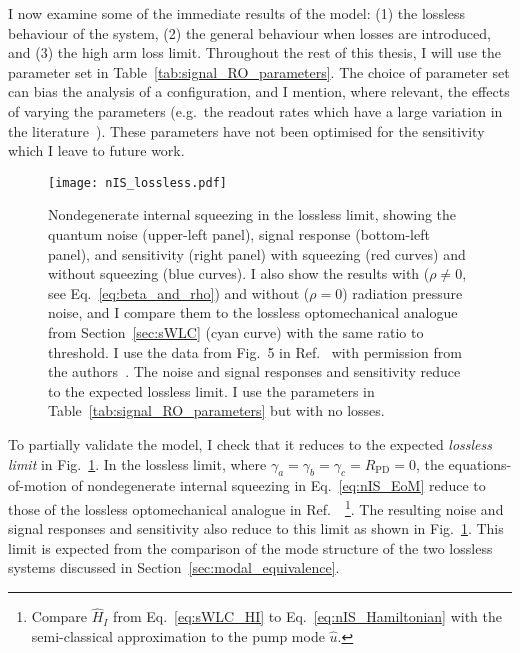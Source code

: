 I now examine some of the immediate results of the model: (1) the lossless behaviour of the system, (2) the general behaviour when losses are introduced, and (3) the high arm loss limit.
Throughout the rest of this thesis, I will use the parameter set in Table~\ref{tab:signal_RO_parameters}. The choice of parameter set can bias the analysis of a configuration, and I mention, where relevant, the effects of varying the parameters (e.g.\ the readout rates which have a large variation in the literature~\cite{liBroadbandSensitivityImprovement2020,miaoDesignGravitationalWaveDetectors2018,korobkoQuantumExpanderGravitationalwave2019}). These parameters have not been optimised for the sensitivity which I leave to future work. %

\label{sec:nIS_lossless_limit}

\begin{figure}
    \centering
    \texttt{[image: nIS\_lossless.pdf]}
    \caption{Nondegenerate internal squeezing in the lossless limit, showing the quantum noise (upper-left panel), signal response (bottom-left panel), and sensitivity (right panel) with squeezing (red curves) and without squeezing (blue curves). I also show the results with ($\rho\neq0$, see Eq.~\ref{eq:beta_and_rho}) and without ($\rho=0$) radiation pressure noise, and I compare them to the lossless optomechanical analogue from Section~\ref{sec:sWLC} (cyan curve) with the same ratio to threshold. I use the data from Fig.~5 in Ref.~\cite{liBroadbandSensitivityImprovement2020} with permission from the authors~\cite{xiangLiPersonalCommunication}. The noise and signal responses and sensitivity reduce to the expected lossless limit. I use the parameters in Table~\ref{tab:signal_RO_parameters} but with no losses.}
    \label{fig:nIS_lossless}
\end{figure}

To partially validate the model, I check that it reduces to the expected \emph{lossless limit} in Fig.~\ref{fig:nIS_lossless}.
In the lossless limit, where $\gamma_a=\gamma_b=\gamma_c=R_\text{PD}=0$, the equations-of-motion of nondegenerate internal squeezing in Eq.~\ref{eq:nIS_EoM} reduce to those of the lossless optomechanical analogue in Ref.~\cite{liBroadbandSensitivityImprovement2020}~\footnote{Compare $\hat H_I$ from Eq.~\ref{eq:sWLC_HI} to Eq.~\ref{eq:nIS_Hamiltonian} with the semi-classical approximation to the pump mode $\hat u$.}. The resulting noise and signal responses and sensitivity also reduce to this limit as shown in Fig.~\ref{fig:nIS_lossless}. This limit is expected from the comparison of the mode structure of the two lossless systems discussed in Section~\ref{sec:modal_equivalence}.

